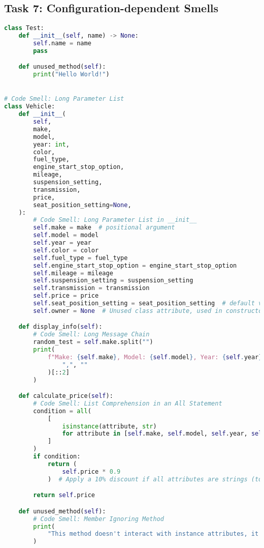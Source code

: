 \documentclass{article}
\begin{document}
\subsection{Task 7: Configuration-dependent Smells}
\begin{lstlisting}[language=Python,caption={Complex Class Structures (sample.py)},label=lst:task7]
class Test:
    def __init__(self, name) -> None:
        self.name = name
        pass

    def unused_method(self):
        print("Hello World!")


# Code Smell: Long Parameter List
class Vehicle:
    def __init__(
        self,
        make,
        model,
        year: int,
        color,
        fuel_type,
        engine_start_stop_option,
        mileage,
        suspension_setting,
        transmission,
        price,
        seat_position_setting=None,
    ):
        # Code Smell: Long Parameter List in __init__
        self.make = make  # positional argument
        self.model = model
        self.year = year
        self.color = color
        self.fuel_type = fuel_type
        self.engine_start_stop_option = engine_start_stop_option
        self.mileage = mileage
        self.suspension_setting = suspension_setting
        self.transmission = transmission
        self.price = price
        self.seat_position_setting = seat_position_setting  # default value
        self.owner = None  # Unused class attribute, used in constructor

    def display_info(self):
        # Code Smell: Long Message Chain
        random_test = self.make.split("")
        print(
            f"Make: {self.make}, Model: {self.model}, Year: {self.year}".upper().replace(
                ",", ""
            )[::2]
        )

    def calculate_price(self):
        # Code Smell: List Comprehension in an All Statement
        condition = all(
            [
                isinstance(attribute, str)
                for attribute in [self.make, self.model, self.year, self.color]
            ]
        )
        if condition:
            return (
                self.price * 0.9
            )  # Apply a 10% discount if all attributes are strings (totally arbitrary condition)

        return self.price

    def unused_method(self):
        # Code Smell: Member Ignoring Method
        print(
            "This method doesn't interact with instance attributes, it just prints a statement."
        )



\end{lstlisting}
\end{document}
